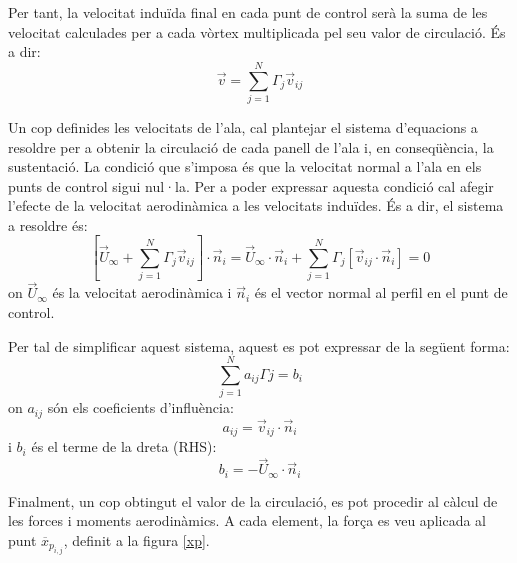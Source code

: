 Per tant, la velocitat induïda final en cada punt de control serà la suma de les velocitat calculades per a cada vòrtex multiplicada pel seu valor de circulació. És a dir:
\begin{equation}
\vec{v}=\sum_{j=1}^{N}\Gamma_{j}\vec{v}_{ij}
\end{equation}

Un cop definides les velocitats de l'ala, cal plantejar el sistema d'equacions a resoldre per a obtenir la circulació de cada panell de l'ala i, en conseqüència, la sustentació. La condició que s'imposa és que la velocitat normal a l'ala en els punts de control sigui nul·la. Per a poder expressar aquesta condició cal afegir l'efecte de la velocitat aerodinàmica a les velocitats induïdes. És a dir, el sistema a resoldre és:
\begin{equation}
\left[\vec{U}_{\infty}+\sum_{j=1}^{N}\Gamma_{j}\vec{v}_{ij}\right]\cdot\vec{n}_{i}=\vec{U}_{\infty}\cdot\vec{n}_{i}+\sum_{j=1}^{N}\Gamma_{j}\left[\vec{v}_{ij}\cdot\vec{n}_{i}\right]=0
\end{equation}
on $\vec{U}_{\infty}$ és la velocitat aerodinàmica i $\vec{n}_{i}$ és el vector normal al perfil en el punt de control.

Per tal de simplificar aquest sistema, aquest es pot expressar de la següent forma:
\begin{equation}
\sum_{j=1}^{N}a_{ij}\Gamma{j}=b_{i}
\end{equation}
on $a_{ij}$ són els coeficients d'influència:
\begin{equation}
a_{ij}=\vec{v}_{ij}\cdot\vec{n}_{i}
\end{equation}
i $b_{i}$ és el terme de la dreta (RHS):
\begin{equation}
b_{i}=-\vec{U}_{\infty}\cdot\vec{n}_{i}
\end{equation}

Finalment, un cop obtingut el valor de la circulació, es pot procedir al càlcul de les forces i moments aerodinàmics. A cada element, la força es veu aplicada al punt $\overline{x}_{p_{i,j}}$, definit a la figura \ref{xp}.

